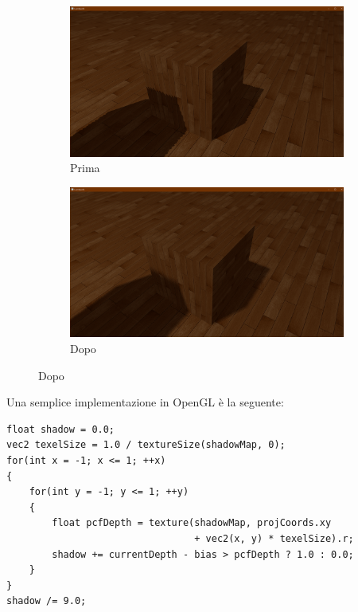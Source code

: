 \documentclass[12pt]{report}
\begin{document}
\begin{figure}[H]
     \centering
     \begin{subfigure}[b]{0.7\linewidth}
         \centering
         \includegraphics[width=\linewidth]{img/LearnOpenGL 23_09_2021 17_16_24.png}
         \caption{Prima}
     \end{subfigure}
     \begin{subfigure}[b]{0.7\linewidth}
         \centering
         \includegraphics[width=\linewidth]{img/LearnOpenGL 23_09_2021 17_16_58.png}
         \caption{Dopo}
     \end{subfigure}
\end{figure}

Una semplice implementazione in OpenGL è la seguente:

\begin{verbatim}
float shadow = 0.0;
vec2 texelSize = 1.0 / textureSize(shadowMap, 0);
for(int x = -1; x <= 1; ++x)
{
    for(int y = -1; y <= 1; ++y)
    {
        float pcfDepth = texture(shadowMap, projCoords.xy 
                                 + vec2(x, y) * texelSize).r; 
        shadow += currentDepth - bias > pcfDepth ? 1.0 : 0.0;        
    }    
}
shadow /= 9.0;
\end{verbatim}
\end{document}
